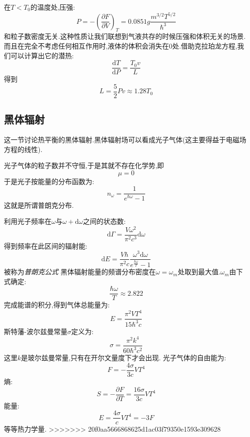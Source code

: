     在$T<T_0$的温度处,压强:
    \[P=-\left( \dfrac{\partial F}{\partial V} \right) _T=0.0851g\frac{m^{3 /2}T^{5/2}}{\hbar^{3}}\]
    和粒子数密度无关.这种性质让我们联想到气液共存的时候压强和体积无关的场景.而且在完全不考虑任何相互作用时,液体的体积会消失在0处.借助克拉珀龙方程,我们可以计算出它的潜热:
    \[\dfrac{\mathrm{d}T}{\mathrm{d} P}=\frac{T_0v}{L}\]
    得到 
    \[L=\frac{5}{2}Pv\approx 1.28T_0\]

\subsection{黑体辐射}
    这一节讨论热平衡的黑体辐射.黑体辐射场可以看成光子气体(这主要得益于电磁场方程的线性).

    光子气体的粒子数并不守恒,于是其就不存在化学势,即 
    \[\mu=0\]
    于是光子按能量的分布函数为:
    \begin{equation}
      n_\omega=\frac{1}{e^{\hbar \omega}-1}
    \end{equation}
    这就是所谓普朗克分布.

    利用光子频率在$\omega$与$\omega +\mathrm{d}  \omega$之间的状态数:
    \[\mathrm{d} \Gamma=\frac{V\omega^{2}}{\pi^{2}c^{3}}\mathrm{d} \omega\]
    得到频率在此区间的辐射能:
    \begin{equation}
      \mathrm{d} E=\frac{V\hbar}{\pi^{2}c}\frac{\omega^{3}\mathrm{d} \omega}{e^{\frac{\hbar\omega}{T}}-1}
    \end{equation}
    被称为\emph{普朗克公式}
    黑体辐射能量的频谱分布密度在$\omega=\omega_m$处取到最大值.$\omega_m$由下式确定:
    \[\frac{\hbar \omega}{T}\approx 2.822\]
    完成能谱的积分,得到气体总能量为:
    \begin{equation}
      E=\frac{\pi^{2}VT^{4}}{15\hbar^{3}c}
    \end{equation}
    斯特藩-波尔兹曼常量$\sigma$定义为:
    \[\sigma=\frac{\pi^{2}k^{4}}{60\hbar^{3}c^{2}}\]
    这里$k$是玻尔兹曼常量,只有在开尔文量度下才会出现.
    光子气体的自由能为:
    \begin{equation}
      F=-\frac{4\sigma}{3c}VT^{4}
    \end{equation}
    熵:
    \begin{equation}
      S=-\dfrac{\partial F}{\partial T}=\frac{16\sigma}{3c}VT^{4}
    \end{equation}
    能量:
    \begin{equation}
      E=\frac{4\sigma}{c}VT^{4}=-3F
    \end{equation}
    等等热力学量.
>>>>>>> 20f0aa5666868625d1ac03f79350e1593e309628
